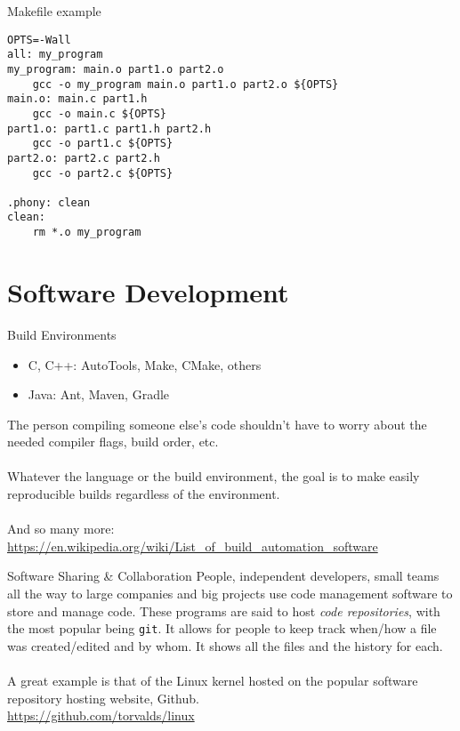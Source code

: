\documentclass[graphics]{beamer}
\begin{document}
\begin{frame}[fragile]{Makefile example}
\begin{verbatim}
OPTS=-Wall
all: my_program
my_program: main.o part1.o part2.o
    gcc -o my_program main.o part1.o part2.o ${OPTS}
main.o: main.c part1.h
    gcc -o main.c ${OPTS}
part1.o: part1.c part1.h part2.h
    gcc -o part1.c ${OPTS}
part2.o: part2.c part2.h
    gcc -o part2.c ${OPTS}

.phony: clean
clean:
    rm *.o my_program
\end{verbatim}
\end{frame}

\section*{Software Development}
\begin{frame}{Build Environments}
    \begin{itemize}
        \item C, C++: AutoTools, Make, CMake, others
        \item Java: Ant, Maven, Gradle
    \end{itemize}
    The person compiling someone else’s code shouldn't have to worry about the needed compiler flags, build order, etc.
    \\ ~~ \\
    Whatever the language or the build environment, the goal is to make easily reproducible builds regardless of the environment.
    \\ ~~ \\
    \footnotesize
    And so many more: \url{https://en.wikipedia.org/wiki/List\_of\_build\_automation\_software}
\end{frame}

\begin{frame}{Software Sharing \& Collaboration}
    People, independent developers, small teams all the way to large companies and big projects use code management software to store and manage code.  These programs are said to host \textit{code repositories}, with the most popular being \texttt{git}. It allows for people to keep track when/how a file was created/edited and by whom. It shows all the files and the history for each.
    \\ ~~ \\
    A great example is that of the Linux kernel hosted on the popular software repository hosting website, Github. \\
    \url{https://github.com/torvalds/linux}
\end{frame}
\end{document}
